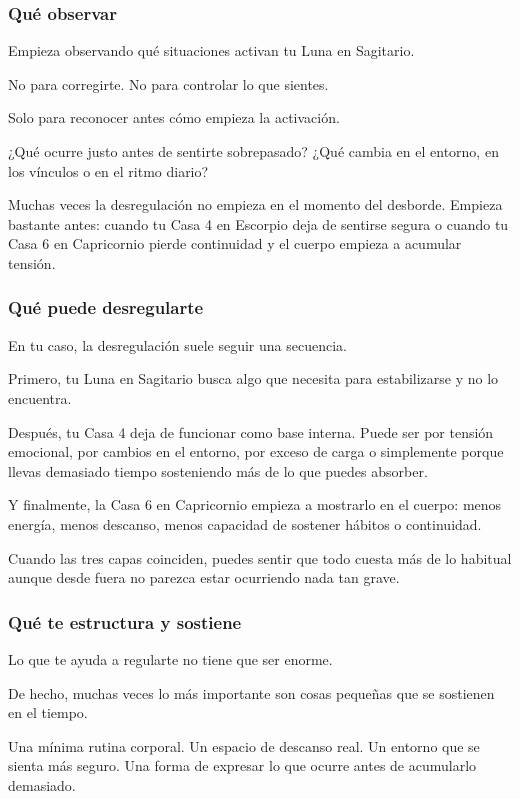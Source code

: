 \documentclass[11pt,a4paper]{article}
\begin{document}
\subsubsection*{Qué observar}

Empieza observando qué situaciones activan tu Luna en Sagitario.

No para corregirte.
No para controlar lo que sientes.

Solo para reconocer antes cómo empieza la activación.

¿Qué ocurre justo antes de sentirte sobrepasado?
¿Qué cambia en el entorno, en los vínculos o en el ritmo diario?

Muchas veces la desregulación no empieza en el momento del desborde. Empieza bastante antes: cuando tu Casa 4 en Escorpio deja de sentirse segura o cuando tu Casa 6 en Capricornio pierde continuidad y el cuerpo empieza a acumular tensión.

\subsubsection*{Qué puede desregularte}

En tu caso, la desregulación suele seguir una secuencia.

Primero, tu Luna en Sagitario busca algo que necesita para estabilizarse y no lo encuentra.

Después, tu Casa 4 deja de funcionar como base interna. Puede ser por tensión emocional, por cambios en el entorno, por exceso de carga o simplemente porque llevas demasiado tiempo sosteniendo más de lo que puedes absorber.

Y finalmente, la Casa 6 en Capricornio empieza a mostrarlo en el cuerpo:
menos energía,
menos descanso,
menos capacidad de sostener hábitos o continuidad.

Cuando las tres capas coinciden, puedes sentir que todo cuesta más de lo habitual aunque desde fuera no parezca estar ocurriendo nada tan grave.

\subsubsection*{Qué te estructura y sostiene}

Lo que te ayuda a regularte no tiene que ser enorme.

De hecho, muchas veces lo más importante son cosas pequeñas que se sostienen en el tiempo.

Una mínima rutina corporal.
Un espacio de descanso real.
Un entorno que se sienta más seguro.
Una forma de expresar lo que ocurre antes de acumularlo demasiado.
\end{document}
